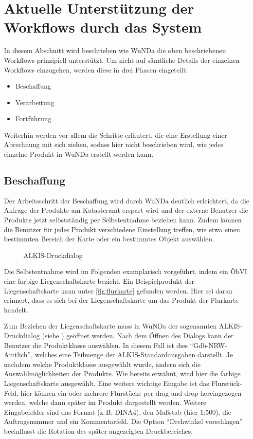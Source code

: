 \section{Aktuelle Unterstützung der Workflows durch das System}

In diesem Abschnitt wird beschrieben wie \ac{WuNDa} die oben beschriebenen Workflows prinzipiell unterstützt.
Um nicht auf sämtliche Details der einzelnen Workflows einzugehen, werden diese in drei Phasen eingeteilt:
\begin{itemize}
 \item Beschaffung
 \item Verarbeitung
 \item Fortführung
\end{itemize}
Weiterhin werden vor allem die Schritte erläutert, die eine Erstellung einer Abrechnung mit sich ziehen, sodass hier nicht beschrieben wird, wie jedes einzelne Produkt in \ac{WuNDa} erstellt werden kann.

\subsection{Beschaffung} \label{subsec:beschaffung}
Der Arbeitsschritt der Beschaffung wird durch \ac{WuNDa} deutlich erleichtert, da die Anfrage der Produkte am Katasteramt erspart wird und der externe Benutzer  die Produkte jetzt selbstständig per Selbstentnahme beziehen kann. Zudem können die Benutzer für jedes Produkt verschiedene Einstellung treffen, wie etwa einen bestimmten Bereich der Karte oder ein bestimmtes Objekt auswählen.

\begin{figure}[htb]
	\centering
	\caption{ALKIS-Druckdialog}
	\label{fig:alkis-druck}
\end{figure}

Die Selbstentnahme wird im Folgenden examplarisch vorgeführt, indem ein \ac{ÖbVI} eine farbige Liegenschaftskarte bezieht. Ein Beispielprodukt der Liegenschaftskarte kann unter \ref{fig:flurkarte} gefunden werden. 
Hier sei daran erinnert, dass es sich bei der Liegenschaftskarte um das  Produkt der Flurkarte handelt. 

Zum Beziehen der Liegenschaftskarte muss in \ac{WuNDa} der sogenannten ALKIS-Druckdialog (siehe ) geöffnet werden.
Nach dem Öffnen des Dialogs kann der Benutzer die Produktklasse auswählen. In diesem Fall ist dies "`Gdb-NRW-Amtlich"', welches eine Teilmenge der ALKIS-Standardausgaben darstellt. 
Je nachdem welche Produktklasse ausgewählt wurde, ändern sich die Auswahlmöglichkeiten der Produkte.
Wie bereits erwähnt, wird hier die farbige Liegenschaftskarte ausgewählt.
Eine weitere wichtige Eingabe ist das Flurstück-Feld, hier können ein oder mehrere Flurstücke per drag-and-drop hereingezogen werden, welche dann später im Produkt dargestellt werden.
Weitere Eingabefelder sind das Format (z.\,B. DINA4), den  Maßstab (hier 1:500), die Auftragsnummer und ein Kommentarfeld. Die Option "`Drehwinkel vorschlagen"' beeinflusst die Rotation des später angezeigten Druckbereiches.

